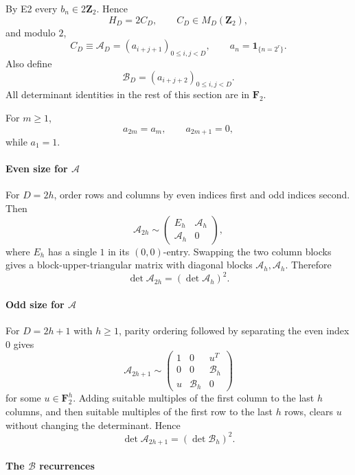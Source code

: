 \documentclass[
  10pt,
  letterpaper,
]{article}
\theoremstyle{definition}
\theoremstyle{remark}
\begin{document}
By E2 every \(b_n\in2\mathbf Z_2\). Hence \[
H_D=2C_D,
\qquad C_D\in M_D(\mathbf Z_2),
\] and modulo \(2\), \[
C_D\equiv\mathcal A_D=(a_{i+j+1})_{0\le i,j<D},
\qquad
a_n=\mathbf1_{\{n=2^r\}}.
\] Also define \[
\mathcal B_D=(a_{i+j+2})_{0\le i,j<D}.
\] All determinant identities in the rest of this section are in
\(\mathbf F_2\).

For \(m\ge1\), \[
a_{2m}=a_m,
\qquad
a_{2m+1}=0,
\] while \(a_1=1\).

\paragraph{\texorpdfstring{Even size for
\(\mathcal A\)}{Even size for \textbackslash mathcal A}}\label{even-size-for-mathcal-a}

For \(D=2h\), order rows and columns by even indices first and odd
indices second. Then \[
\mathcal A_{2h}\sim
\begin{pmatrix}
E_h&\mathcal A_h\\
\mathcal A_h&0
\end{pmatrix},
\] where \(E_h\) has a single \(1\) in its \((0,0)\)-entry. Swapping the
two column blocks gives a block-upper-triangular matrix with diagonal
blocks \(\mathcal A_h,\mathcal A_h\). Therefore \[
\det\mathcal A_{2h}=(\det\mathcal A_h)^2.
\tag{E3.1}
\]

\paragraph{\texorpdfstring{Odd size for
\(\mathcal A\)}{Odd size for \textbackslash mathcal A}}\label{odd-size-for-mathcal-a}

For \(D=2h+1\) with \(h\ge1\), parity ordering followed by separating
the even index \(0\) gives \[
\mathcal A_{2h+1}\sim
\begin{pmatrix}
1&0&u^T\\
0&0&\mathcal B_h\\
u&\mathcal B_h&0
\end{pmatrix}
\] for some \(u\in\mathbf F_2^h\). Adding suitable multiples of the
first column to the last \(h\) columns, and then suitable multiples of
the first row to the last \(h\) rows, clears \(u\) without changing the
determinant. Hence \[
\det\mathcal A_{2h+1}=(\det\mathcal B_h)^2.
\tag{E3.2}
\]

\paragraph{\texorpdfstring{The \(\mathcal B\)
recurrences}{The \textbackslash mathcal B recurrences}}\label{the-mathcal-b-recurrences}
\end{document}
